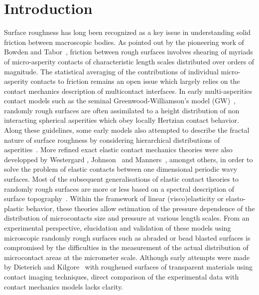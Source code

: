 \documentclass[pre,groupedaddress,showkeys,showpacs,twocolumn]{revtex4}
\begin{document}
\section*{Introduction}
%
\indent Surface roughness has long been recognized as a key issue in understanding solid friction between macroscopic bodies. As pointed out by the pioneering work of Bowden and Tabor~\cite{bowden1958}, friction between rough surfaces involves shearing of myriads of micro-asperity contacts of characteristic length scales distributed over orders of magnitude. The statistical averaging of the contributions of individual micro-asperity contacts to friction remains an open issue which largely relies on the contact mechanics description of multicontact interfaces. In early multi-asperities contact models such as the seminal Greenwood-Williamson's model (GW)~\cite{Greenwood1966}, randomly rough surfaces are often assimilated to a height distribution of non interacting spherical asperities which obey locally Hertzian contact behavior. Along these guidelines, some early models also attempted to describe the fractal nature of surface roughness by considering hierarchical distributions of asperities~\cite{archard1957}.
More refined exact elastic contact mechanics theories were also developped by Westergard \cite{Westergaard1939}, Johnson~\cite{johnson1985b} and Manners~\cite{manners2003,manners1998}, amongst others, in order to solve the problem of elastic contacts between one dimensional periodic wavy surfaces. Most of the subsequent generalisations of elastic contact theories to randomly rough surfaces are more or less based on a spectral description of surface topography~\cite{persson2001,hyun2004,campana2008,Hyun2007}. Within the framework of linear (visco)elasticity or elasto-plastic behavior, these theories allow estimation of the pressure dependence of the distribution of microcontacts size and pressure at various length scales. From an experimental perspective, elucidation and validation of these models using microscopic randomly rough surfaces such as abraded or bead blasted surfaces is compromised by the difficulties in the measurement of the actual distribution of microcontact areas at the micrometer scale. 
Although early attempts were made by Dieterich and Kilgore~\cite{dieterich1996} with roughened surfaces of transparent materials using contact imaging techniques, direct comparison of the experimental data with contact mechanics models lacks clarity.\\
\end{document}
